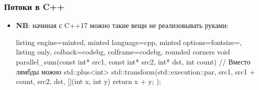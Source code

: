 \documentclass[10pt]{beamer}
\begin{document}
\begin{frame}[fragile]
\frametitle{Потоки в C++}
\begin{itemize}
\item \textbf{NB}: начиная с C++17 можно такие вещи не реализовывать руками:
\begin{tcblisting}{listing engine=minted, minted language=cpp, minted options={fontsize=\scriptsize}, listing only, colback=codebg, colframe=codebg, rounded corners}
void parallel_sum(const int* src1, const int* src2,
  int* dst, int count)
{
  // Вместо лямбды можно std::plus<int>{}
  std::transform(std::execution::par, src1, src1 + count,
    src2, dst, [](int x, int y){ return x + y; });
}
\end{tcblisting}
\end{itemize}
\end{frame}
\end{document}
